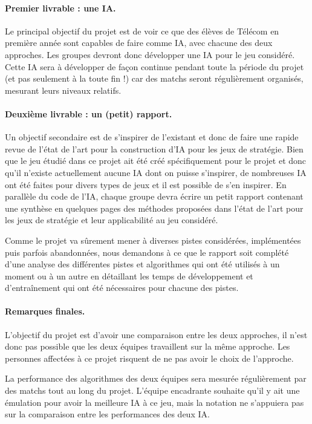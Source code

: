 \documentclass{article}
\begin{document}
\paragraph{Premier livrable : une IA.}
Le principal objectif du projet est de voir ce que des élèves de
Télécom en première année sont capables de faire comme IA, avec
chacune des deux approches. Les groupes devront donc développer une IA
pour le jeu considéré. Cette IA sera à développer de façon continue
pendant toute la période du projet (et pas seulement à la toute fin !)
car des matchs seront régulièrement organisés, mesurant leurs niveaux
relatifs.

\paragraph{Deuxième livrable : un (petit) rapport.}

Un objectif secondaire est de s'inspirer de l'existant et donc de
faire une rapide revue de l'état de l'art pour la construction d'IA
pour les jeux de stratégie. Bien que le jeu étudié dans ce projet ait
été créé spécifiquement pour le projet et donc qu'il n'existe
actuellement aucune IA dont on puisse s'inspirer, de nombreuses IA ont
été faites pour divers types de jeux et il est possible de s'en
inspirer. En parallèle du code de l'IA, chaque groupe devra écrire un
petit rapport contenant une synthèse en quelques pages des méthodes
proposées dans l'état de l'art pour les jeux de stratégie et leur
applicabilité au jeu considéré.

Comme le projet va sûrement mener à diverses pistes considérées,
implémentées puis parfois abandonnées, nous demandons à ce que le
rapport soit complété d'une analyse des différentes pistes et
algorithmes qui ont été utilisés à un moment ou à un autre en
détaillant les temps de développement et d'entraînement qui ont été
nécessaires pour chacune des pistes.

\paragraph{Remarques finales.}
L'objectif du projet est d'avoir une comparaison entre les deux
approches, il n'est donc pas possible que les deux équipes travaillent
sur la même approche. Les personnes affectées à ce projet risquent
de ne pas avoir le choix de l'approche.

La performance des algorithmes des deux équipes sera mesurée
régulièrement par des matchs tout au long du projet. L'équipe
encadrante souhaite qu'il y ait une émulation pour avoir la meilleure
IA à ce jeu, mais la notation ne s'appuiera pas sur la comparaison
entre les performances des deux IA.
\end{document}
